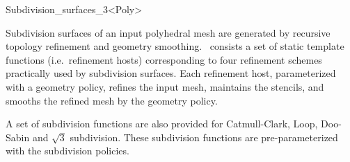
\ccRefPageBegin



\begin{ccRefClass}{Subdivision_surfaces_3<Poly>}

\ccDefinition

Subdivision surfaces of an input polyhedral mesh
are generated by recursive topology refinement and geometry
smoothing. \ccClassTemplateName\ consists a set of static 
template functions (i.e.~refinement hosts) corresponding 
to four refinement schemes practically used by subdivision surfaces. 
Each refinement host, parameterized with a geometry policy,
refines the input mesh, maintains the stencils, and smooths the 
refined mesh by the geometry policy.

A set of subdivision functions are also provided  
for Catmull-Clark, Loop, Doo-Sabin and $\sqrt{3}$ subdivision.
These subdivision functions are pre-parameterized with the
subdivision policies.




\ccParameters


\end{ccRefClass}
